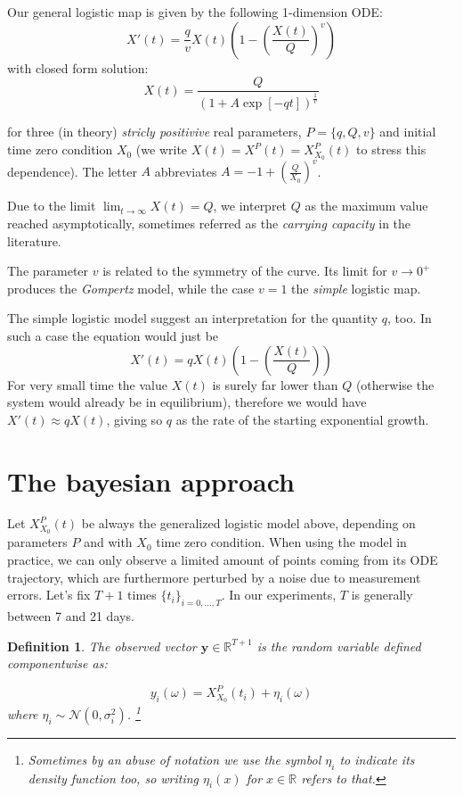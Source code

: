 \documentclass[8pt]{article}
\newtheorem{definition}{Definition}
\begin{document}
Our general logistic map is given by the following 1-dimension ODE:
\begin{equation}
	X'(t) = \frac{q}{v} X(t) 
	\left ( 1 - \left( \frac{X(t)}{Q} \right)^{v}\right )
\end{equation}
with closed form solution:
\begin{equation}
	X(t) = \frac{Q} { (1 + A \exp[-q t])^{\frac{1}{v}}}
\end{equation}

for three (in theory) \emph{stricly positivive} real parameters, 
$P = \{ q, Q, v\}$ and initial time zero condition $X_0$
(we write $X(t) = X^P(t) = X^P_{X_0}(t)$ to stress this dependence).
The letter $A$ abbreviates 
$A = -1 + \left ( \frac{Q} { X_0} \right )^{v}$.


Due to the limit $\lim_{t \to \infty} X(t) = Q$, 
we interpret $Q$ as
the maximum value reached asymptotically, sometimes
referred as the \emph{carrying capacity} in the literature.


The parameter $v$ is related to the symmetry of the curve.
Its limit for $v \to 0^+$ produces the \emph{Gompertz} model,
while the case $v = 1$ the \emph{simple} logistic map.


The simple logistic model suggest an interpretation for the quantity
$q$, too. In such a case the equation would just be
\begin{equation}
	X'(t) = q X(t) 
	\left ( 1 - \left( \frac{X(t)}{Q} \right)\right )
\end{equation}
For very small time the value $X(t)$ is surely far lower than
$Q$ (otherwise the system would already be in equilibrium), therefore
we would have $X'(t) \approx q X(t)$, giving so
$q$ as the rate of the starting exponential growth.


\section{The bayesian approach}
Let $X^P_{X_0}(t)$ be always the generalized logistic model above,
depending on
parameters $P$ and with $X_0$ time zero condition.
When using the model in practice, we can only observe a
limited amount of points coming from its ODE trajectory, 
which are furthermore perturbed by a noise due to measurement
errors.
Let's fix $T+1$ times $\{t_i\}_{i = 0,\dots, T}$.
In our experiments, $T$ is generally between 7 and 21 days.

\begin{definition}
	The \emph{observed vector} $\textbf{y} \in \mathbb{R}^{T+1}$
	is the random variable defined componentwise as:

\begin{equation}
	y_i(\omega) = X^P_{X_0} (t_i) + \eta_i(\omega)
\end{equation}
where $\eta_i \sim \mathcal{N}(0, \sigma^2_i)$.
\footnote{Sometimes by an abuse of notation 
we use the symbol $\eta_i$ to indicate its density function too,
so writing $\eta_i(x)$ for $x \in \mathbb{R}$ refers to that.}
\end{definition}
\end{document}
